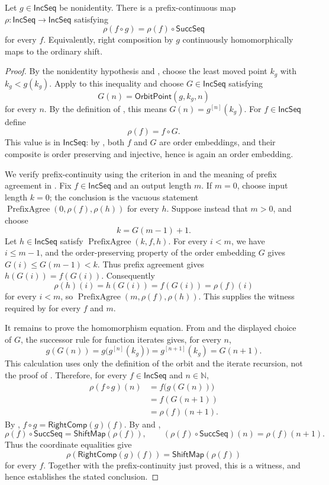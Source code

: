 \begin{lemma}
Let $g\in\mathsf{IncSeq}$ be nonidentity.  There is a prefix-continuous map
$\rho:\mathsf{IncSeq}\to\mathsf{IncSeq}$ satisfying
\[
\rho(f\circ g)=\rho(f)\circ\mathsf{SuccSeq}
\]
for every $f$.  Equivalently, right composition by $g$ continuously
homomorphically maps to the ordinary shift.
\end{lemma}
\begin{proof}
By the nonidentity hypothesis and , choose the
least moved point $k_g$ with $k_g<g(k_g)$.  Apply  to
this inequality and
choose $G\in\mathsf{IncSeq}$ satisfying
\[
G(n)=\mathsf{OrbitPoint}(g,k_g,n)
\]
for every $n$.  By the definition of , this means
$G(n)=g^{[n]}(k_g)$.  For $f\in\mathsf{IncSeq}$ define
\[
\rho(f)=f\circ G.
\]
This value is in $\mathsf{IncSeq}$: by , both $f$ and $G$
are order embeddings, and their composite is order preserving and
injective, hence is again an order embedding.

We verify prefix-continuity using the criterion in 
and the meaning of prefix agreement in .  Fix
$f\in\mathsf{IncSeq}$ and an output length $m$.  If $m=0$, choose input
length $k=0$; the conclusion is the vacuous statement
\(\operatorname{PrefixAgree}(0,\rho(f),\rho(h))\) for every $h$.
Suppose instead that $m>0$, and choose
\[
k=G(m-1)+1.
\]
Let $h\in\mathsf{IncSeq}$ satisfy
$\operatorname{PrefixAgree}(k,f,h)$.  For every $i<m$, we have
$i\leq m-1$, and the order-preserving property of the order embedding
$G$ gives $G(i)\leq G(m-1)<k$.  Thus prefix agreement gives
$h(G(i))=f(G(i))$.  Consequently
\[
\rho(h)(i)=h(G(i))=f(G(i))=\rho(f)(i)
\]
for every $i<m$, so
$\operatorname{PrefixAgree}(m,\rho(f),\rho(h))$.  This supplies the
witness required by  for every $f$ and $m$.

It remains to prove the homomorphism equation.  From
 and the displayed choice of $G$, the successor rule
for function iterates gives, for every $n$,
\[
g(G(n))=g\bigl(g^{[n]}(k_g)\bigr)=g^{[n+1]}(k_g)=G(n+1).
\]
This calculation uses only the definition of the orbit and the iterate
recursion, not the proof of .  Therefore, for every
$f\in\mathsf{IncSeq}$ and $n\in\mathbb N$,
\[
\begin{aligned}
\rho(f\circ g)(n)
  &=f\bigl(g(G(n))\bigr)\\
  &=f(G(n+1))\\
  &=\rho(f)(n+1).
\end{aligned}
\]
By , $f\circ g=\mathsf{RightComp}(g)(f)$.  By
 and ,
\[
\rho(f)\circ\mathsf{SuccSeq}=\mathsf{ShiftMap}(\rho(f)),
\qquad
(\rho(f)\circ\mathsf{SuccSeq})(n)=\rho(f)(n+1).
\]
Thus the coordinate equalities give
\[
\rho(\mathsf{RightComp}(g)(f))
 =\mathsf{ShiftMap}(\rho(f))
\]
for every $f$.  Together with the prefix-continuity just proved, this is a
 witness, and hence establishes the stated conclusion.
\end{proof}
